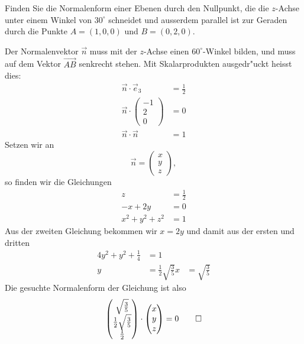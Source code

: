 Finden Sie die Normalenform einer Ebenen durch den
Nullpunkt, die die $z$-Achse
unter einem Winkel von $30^\circ$ schneidet und ausserdem
parallel ist zur Geraden durch die Punkte $A=(1,0,0)$ und
$B=(0,2,0)$.

\begin{loesung}
Der Normalenvektor $\vec n$ muss mit der $z$-Achse einen $60^\circ$-Winkel
bilden, und muss auf dem Vektor $\overrightarrow{AB}$ senkrecht stehen.
Mit Skalarprodukten ausgedr"uckt heisst dies:
\begin{align*}
\vec n\cdot \vec e_3&=\frac12\\
\vec n\cdot \begin{pmatrix}-1\\2\\0\end{pmatrix}&=0\\
\vec n\cdot\vec n&=1
\end{align*}
Setzen wir an
\[
\vec n =
\begin{pmatrix}x\\y\\z\end{pmatrix},
\]
so finden wir die Gleichungen
\begin{align*}
z&= \frac12\\
-x+2y&=0\\
x^2+y^2+z^2&=1
\end{align*}
Aus der zweiten Gleichung bekommen wir $x=2y$ und damit aus der ersten
und dritten
\begin{align*}
4y^2+y^2+\frac14&=1
\\
y&=\frac12\sqrt{\frac35}
x&=\sqrt{\frac35}
\end{align*}
Die gesuchte Normalenform der Gleichung ist also
\[
\begin{pmatrix}
\sqrt{\frac35}\\
\frac12\sqrt{\frac35}\\
\frac12
\end{pmatrix}\cdot \begin{pmatrix}x\\y\\z\end{pmatrix} =0
\qedhere
\]
\end{loesung}


